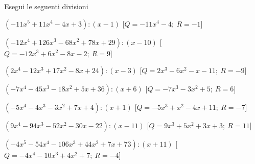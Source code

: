 \subsubsection*{}

\begin{esercizio}\label{ese:div.004}
 Esegui le seguenti divisioni
 \begin{enumeratea}
  \item  $\left(-11 x^5 +11 x^4 -4 x +3 \right) : \left(x -1 \right)$
   \hfill [$Q = -11 x^4 -4;~R = -1$]
  \item  $\left(-12 x^4 +126 x^3 -68 x^2 +78 x +29 \right) : \left(x -10 \right)$
   \hfill [$Q = -12 x^3 +6 x^2 -8 x -2;~R = 9$]
  \item  $\left(2 x^4 -12 x^3 +17 x^2 -8 x +24 \right) : \left(x -3 \right)$
   \hfill [$Q = 2 x^3 -6 x^2 - x -11;~R = -9$]
  \item  $\left(-7 x^4 -45 x^3 -18 x^2 +5 x +36 \right) : \left(x +6 \right)$
   \hfill [$Q = -7 x^3 -3 x^2 +5;~R = 6$]
  \item  $\left(-5 x^4 -4 x^3 -3 x^2 +7 x +4 \right) : \left(x +1 \right)$
   \hfill [$Q = -5 x^3 + x^2 -4 x +11;~R = -7$]
  \item  $\left(9 x^4 -94 x^3 -52 x^2 -30 x -22 \right) : \left(x -11 \right)$
   \hfill [$Q = 9 x^3 +5 x^2 +3 x +3;~R = 11$]
  \item  $\left(-4 x^5 -54 x^4 -106 x^3 +44 x^2 +7 x +73 \right) : 
          \left(x +11 \right)$
   \hfill [$Q = -4 x^4 -10 x^3 +4 x^2 +7;~R = -4$]

\end{enumeratea}
\end{esercizio}

